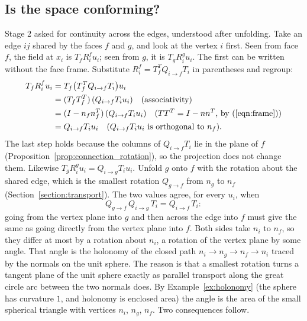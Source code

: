 \subsection{Is the space conforming?}
\label{section:r1_conformity}

Stage 2 asked for continuity across the edges, understood after unfolding. Take an edge $ij$ shared by the faces $f$ and $g$, and look at the vertex $i$ first. Seen from face $f$, the field at $x_i$ is $T_f R_i^f u_i$; seen from $g$, it is $T_g R_i^g u_i$. The first can be written without the face frame. Substitute $R_i^f = T_f^TQ_{i\to f}T_i$ in parentheses and regroup:
\begin{align*}
T_f R_i^f u_i &= T_f\big(T_f^T Q_{i\to f}T_i\big) u_i \\
&= (T_f T_f^T)\, (Q_{i\to f}T_i u_i) \quad \text{(associativity)}\\
&= (I - n_fn_f^T)\, (Q_{i\to f}T_i u_i) \quad \text{($TT^T = I - nn^T$, by~(\ref{eqn:frame}))}\\
&= Q_{i\to f}T_i u_i \quad \text{($Q_{i\to f}T_iu_i$ is orthogonal to $n_f$)} .
\end{align*}
The last step holds because the columns of $Q_{i\to f}T_i$ lie in the plane of $f$ (Proposition~\ref{prop:connection_rotation}), so the projection does not change them. Likewise $T_gR_i^gu_i = Q_{i\to g}T_iu_i$. Unfold $g$ onto $f$ with the rotation about the shared edge, which is the smallest rotation $Q_{g\to f}$ from $n_g$ to $n_f$ (Section~\ref{section:transport}). The two values agree, for every $u_i$, when
\begin{equation*}
Q_{g\to f}\, Q_{i\to g}\, T_i = Q_{i\to f}\, T_i :
\end{equation*}
going from the vertex plane into $g$ and then across the edge into $f$ must give the same as going directly from the vertex plane into $f$. Both sides take $n_i$ to $n_f$, so they differ at most by a rotation about $n_i$, a rotation of the vertex plane by some angle. That angle is the holonomy of the closed path $n_i \to n_g \to n_f \to n_i$ traced by the normals on the unit sphere. The reason is that a smallest rotation turns a tangent plane of the unit sphere exactly as parallel transport along the great circle arc between the two normals does. By Example~\ref{ex:holonomy} (the sphere has curvature $1$, and holonomy is enclosed area) the angle is the area of the small spherical triangle with vertices $n_i$, $n_g$, $n_f$. Two consequences follow.
